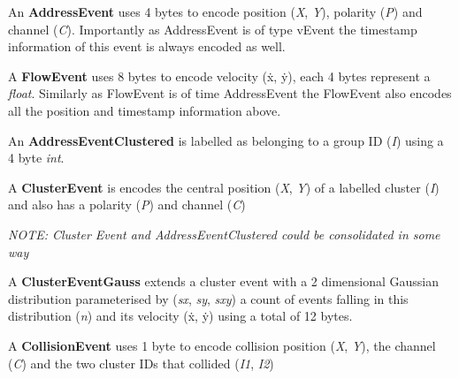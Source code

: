 An {\bfseries Address\+Event} uses 4 bytes to encode position ({\itshape X}, {\itshape Y}), polarity ({\itshape P}) and channel ({\itshape C}). Importantly as Address\+Event is of type v\+Event the timestamp information of this event is always encoded as well. \begin{DoxyVerb}
\end{DoxyVerb}


A {\bfseries Flow\+Event} uses 8 bytes to encode velocity (ẋ, ẏ), each 4 bytes represent a {\itshape float}. Similarly as Flow\+Event is of time Address\+Event the Flow\+Event also encodes all the position and timestamp information above. \begin{DoxyVerb}
\end{DoxyVerb}


An {\bfseries Address\+Event\+Clustered} is labelled as belonging to a group ID ({\itshape I}) using a 4 byte {\itshape int}. \begin{DoxyVerb}
\end{DoxyVerb}


A {\bfseries Cluster\+Event} is encodes the central position ({\itshape X}, {\itshape Y}) of a labelled cluster ({\itshape I}) and also has a polarity ({\itshape P}) and channel ({\itshape C}) \begin{DoxyVerb}
\end{DoxyVerb}


{\itshape N\+O\+TE\+: Cluster Event and Address\+Event\+Clustered could be consolidated in some way}

A {\bfseries Cluster\+Event\+Gauss} extends a cluster event with a 2 dimensional Gaussian distribution parameterised by ({\itshape sx}, {\itshape sy}, {\itshape sxy}) a count of events falling in this distribution ({\itshape n}) and its velocity (ẋ, ẏ) using a total of 12 bytes. \begin{DoxyVerb}
\end{DoxyVerb}


A {\bfseries Collision\+Event} uses 1 byte to encode collision position ({\itshape X}, {\itshape Y}), the channel ({\itshape C}) and the two cluster I\+Ds that collided ({\itshape I1}, {\itshape I2}) \begin{DoxyVerb}
\end{DoxyVerb}


